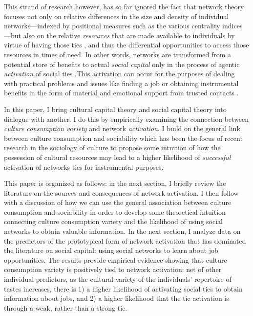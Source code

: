 \documentclass[12pt]{article}
\begin{document}
This strand of research however, has so far ignored the fact that network theory focuses not only on relative differences in the size and density of individual networks---indexed by positional measures such as the various centrality indices \citep{freeman77, borgatti05}---but also on the relative \emph{resources} that are made available to individuals by virtue of having those ties \citep{bourdieu86, coleman88, portes98, lin01b}, and thus the differential opportunities to access those resources in times of need. In other words, networks are transformed from a potential store of benefits to actual\emph{ social capital} only in the process of agentic \emph{activation} of social ties \citep{lin99, lin00, lin01a, lin01b,mouw03, yakubovich05, lin_etal81a, lin_etal81b, lin_dumin86}.This activation can occur for the purposes of dealing with practical problems and issues like finding a job \citep{granovetter73} or obtaining  instrumental benefits in the form of material and emotional support from trusted contacts \citep{wellman_wortley90}. 

In this paper, I bring cultural capital theory and social capital theory into dialogue with another.  I do this by empirically examining the connection between \emph{culture consumption variety} \citep{dimaggio87, erickson96, peterson_rossman08} and network \emph{activation}.  I build on the general link between culture consumption and sociability which has been the focus of recent research in the sociology of culture \citep{bennett_etal99, witte_ryan04, cardon_granjon05, lizardo06a, jeannotte03} to propose some intuition of how the possession of cultural resources may lead to a higher likelihood of \emph{successful} activation of networks ties for instrumental purposes.

This paper is organized as follows: in the next section, I briefly review the literature on the sources and consequences of network activation. I then follow with a discussion of how we can use the general association between culture consumption and sociability in order to develop some theoretical intuition connecting culture consumption variety and the likelihood of using social networks to obtain valuable information. In the next section, I analyze data on the predictors of the prototypical form of network activation that has dominated the literature on social capital: using social networks to learn about job opportunities.  The results provide empirical evidence showing that culture consumption variety is positively tied to network activation:  net of other individual predictors, as the cultural variety of the individuals' repertoire of tastes increases, there is 1) a higher likelihood of activating social ties to obtain information about jobs, and 2) a higher likelihood that the tie activation is through a weak, rather than a strong tie. 
\end{document}
